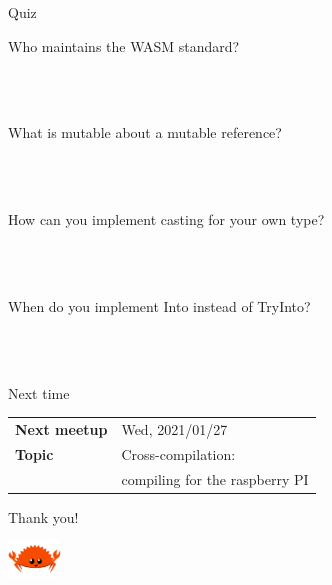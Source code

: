 \documentclass{beamer}
\begin{document}
\begin{frame}[fragile]{Quiz}
  \begin{description}
    \item[Who maintains the WASM standard?] \hfill{} \\
      ~
    \item[What is mutable about a mutable reference?] \hfill{} \\
      ~
    \item[How can you implement casting for your own type?] \hfill{} \\
      ~
    \item[When do you implement Into instead of TryInto?] \hfill{} \\
      ~
  \end{description}
\end{frame}

\begin{frame}[fragile]{Next time}
  \begin{tabular}{ll}
    \textbf{Next meetup}   & Wed, 2021/01/27 \\
    \textbf{Topic}         & Cross-compilation: \\
                           & compiling for the raspberry PI
  \end{tabular}
\end{frame}

\begin{frame}[standout]
  Thank you!

  \includegraphics[width=40pt]{images/rustacean-flat-happy.png}
\end{frame}
\end{document}

